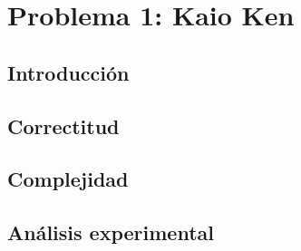 \section{Problema 1:  Kaio Ken}
\subsection{Introducción}

\subsection{Correctitud}

\subsection{Complejidad}

\subsection{Análisis experimental}


